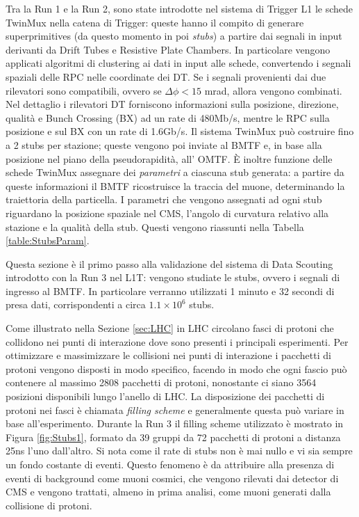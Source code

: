 Tra la Run 1 e la Run 2, sono state introdotte nel sistema di Trigger L1 le schede TwinMux nella catena di Trigger: queste hanno il compito di generare superprimitives (da questo momento in poi \textit{stubs}) a partire dai segnali in input derivanti da Drift Tubes e Resistive Plate Chambers. \newline
In particolare vengono applicati algoritmi di clustering ai dati in input alle schede, convertendo i segnali spaziali delle RPC nelle coordinate dei DT. Se i segnali provenienti dai due rilevatori sono compatibili, ovvero se $\Delta \phi < 15$ \si{mrad}, allora vengono combinati. Nel dettaglio i rilevatori DT forniscono informazioni sulla posizione, direzione, qualità e Bunch Crossing (BX) ad un rate di 480Mb/s, mentre le RPC sulla posizione e sul BX con un rate di 1.6Gb/s.\newline
Il sistema TwinMux può costruire fino a 2 stubs per stazione; queste vengono poi inviate al BMTF e, in base alla posizione nel piano della pseudorapidità, all' OMTF. \newline
È inoltre funzione delle schede TwinMux assegnare dei \textit{parametri} a ciascuna stub generata: a partire da queste informazioni il BMTF ricostruisce la traccia del muone, determinando la traiettoria della particella. I parametri che vengono assegnati ad ogni stub riguardano la posizione spaziale nel CMS, l'angolo di curvatura relativo alla stazione e la qualità della stub. Questi vengono riassunti nella Tabella \ref{table:StubsParam}.

Questa sezione è il primo passo alla validazione del sistema di Data Scouting introdotto con la Run 3 nel L1T: vengono studiate le stubs, ovvero i segnali di ingresso al BMTF. In particolare verranno utilizzati 1 minuto e 32 secondi di presa dati, corrispondenti a circa $1.1 \times 10^{6}$ stubs. 

Come illustrato nella Sezione \ref{sec:LHC} in LHC circolano fasci di protoni che collidono nei punti di interazione dove sono presenti i principali esperimenti. Per ottimizzare e massimizzare le collisioni nei punti di interazione i pacchetti di protoni vengono disposti in modo specifico, facendo in modo che ogni fascio può contenere al massimo 2808 pacchetti di protoni, nonostante ci siano 3564 posizioni disponibili lungo l'anello di LHC. La disposizione dei pacchetti di protoni nei fasci è chiamata \textit{filling scheme} e generalmente questa può variare in base all'esperimento. Durante la Run 3 il filling scheme utilizzato è mostrato in Figura \ref{fig:Stubs1}, formato da 39 gruppi da 72 pacchetti di protoni a distanza 25ns l'uno dall'altro\cite{Bailey}. \newline
Si nota come il rate di stubs non è mai nullo e vi sia sempre un fondo costante di eventi. Questo fenomeno è da attribuire alla presenza di eventi di background come muoni cosmici, che vengono rilevati dai detector di CMS e vengono trattati, almeno in prima analisi, come muoni generati dalla collisione di protoni.



